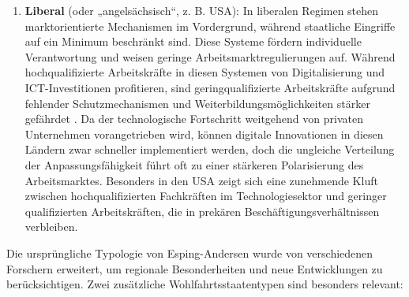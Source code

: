 \begin{enumerate}
    \item \textbf{Liberal} (oder „angelsächsisch“, z. B. USA): In liberalen Regimen 
    stehen marktorientierte Mechanismen im Vordergrund, während staatliche Eingriffe auf ein 
    Minimum beschränkt sind. Diese Systeme fördern individuelle Verantwortung und weisen 
    geringe Arbeitsmarktregulierungen auf. Während hochqualifizierte Arbeitskräfte in diesen 
    Systemen von Digitalisierung und \ac{ICT}-Investitionen profitieren, sind 
    geringqualifizierte Arbeitskräfte aufgrund fehlender Schutzmechanismen und 
    Weiterbildungsmöglichkeiten stärker gefährdet \parencite[S. 12f]{goodin1999thereal}. 
    Da der technologische Fortschritt weitgehend von privaten Unternehmen vorangetrieben wird, 
    können digitale Innovationen in diesen Ländern zwar schneller implementiert werden, doch 
    die ungleiche Verteilung der Anpassungsfähigkeit führt oft zu einer stärkeren Polarisierung 
    des Arbeitsmarktes. Besonders in den USA zeigt sich eine zunehmende Kluft zwischen 
    hochqualifizierten Fachkräften im Technologiesektor und geringer qualifizierten Arbeitskräften, 
    die in prekären Beschäftigungsverhältnissen verbleiben.

\end{enumerate}

Die ursprüngliche Typologie von Esping-Andersen wurde von verschiedenen Forschern erweitert, 
um regionale Besonderheiten und neue Entwicklungen zu berücksichtigen. Zwei zusätzliche 
Wohlfahrtsstaatentypen sind besonders relevant:

